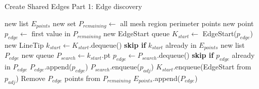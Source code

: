 \begin{algorithm}[!htb]
	\caption{Create Shared Edges Part 1: Edge discovery}\label{alg:shared_edges_1}
\begin{algorithmic}[1]
	\State new list $E_{points}$ 
	\State new set $P_{remaining} \leftarrow$ all mesh region perimeter points
	\label{alg:shared_edges:while_k_remaining}
		\State new point $p_{edge} \leftarrow$ first value in $P_{remaining}$
		\State new EdgeStart queue $K_{start} \leftarrow$ EdgeStart($p_{edge}$) 
		\label{alg:shared_edges:while_k_start}
			\State new LineTip $k_{start} \leftarrow K_{start}$.dequeue()
			\State \textbf{skip if} $k_{start}$ already in $E_{points}$
			\State new list $P_{edge}$ 
			\State new queue $P_{search} \leftarrow k_{start}$.pt %
				\State $p_{edge} \leftarrow P_{search}$.dequeue()
				\State \textbf{skip if} $p_{edge}$ already in $P_{edge}$
				\State $P_{edge}$.append($p_{edge}$)
						\State $P_{search}$.enqueue($p_{adj}$)
					\EndIf
						\State $K_{start}$.enqueue(EdgeStart from $p_{adj}$)
					\EndIf
				\EndFor
			\EndWhile
			\State Remove $P_{edge}$ points from $P_{remaining}$
			\State $E_{points}$.append($P_{edge}$)
		\EndWhile
	\EndWhile
\end{algorithmic}
\end{algorithm}

